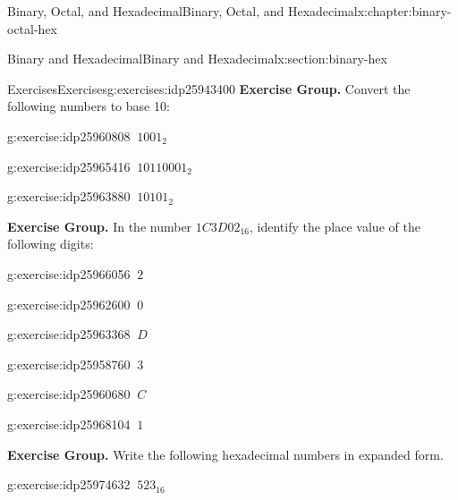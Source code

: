 \documentclass[twoside,10pt,]{book}
\numberwithin{equation}{section}
\begin{document}
\begin{chapterptx}{Binary, Octal, and Hexadecimal}{}{Binary, Octal, and Hexadecimal}{}{}{x:chapter:binary-octal-hex}
\begin{sectionptx}{Binary and Hexadecimal}{}{Binary and Hexadecimal}{}{}{x:section:binary-hex}
\begin{exercises-subsection}{Exercises}{}{Exercises}{}{}{g:exercises:idp25943400}
\textbf{Exercise Group.}\space\space%
Convert the following numbers to base 10:%
\begin{exercisegroup}
\begin{divisionexerciseeg}{10}{}{}{g:exercise:idp25960808}%
\(\ 1001_2\)\end{divisionexerciseeg}%
\begin{divisionexerciseeg}{11}{}{}{g:exercise:idp25965416}%
\(\ 10110001_2\)\end{divisionexerciseeg}%
\begin{divisionexerciseeg}{12}{}{}{g:exercise:idp25963880}%
\(\ 10101_2\)\end{divisionexerciseeg}%
\end{exercisegroup}
\par\medskip\noindent
\par\medskip\noindent%
\textbf{Exercise Group.}\space\space%
In the number \(1C3D02_{16}\), identify the place value of the following digits:%
\begin{exercisegroup}
\begin{divisionexerciseeg}{13}{}{}{g:exercise:idp25966056}%
\(\ 2\)\end{divisionexerciseeg}%
\begin{divisionexerciseeg}{14}{}{}{g:exercise:idp25962600}%
\(\ 0\)\end{divisionexerciseeg}%
\begin{divisionexerciseeg}{15}{}{}{g:exercise:idp25963368}%
\(\ D\)\end{divisionexerciseeg}%
\begin{divisionexerciseeg}{16}{}{}{g:exercise:idp25958760}%
\(\ 3\)\end{divisionexerciseeg}%
\begin{divisionexerciseeg}{17}{}{}{g:exercise:idp25960680}%
\(\ C\)\end{divisionexerciseeg}%
\begin{divisionexerciseeg}{18}{}{}{g:exercise:idp25968104}%
\(\ 1\)\end{divisionexerciseeg}%
\end{exercisegroup}
\par\medskip\noindent
\par\medskip\noindent%
\textbf{Exercise Group.}\space\space%
Write the following hexadecimal numbers in expanded form.%
\begin{exercisegroup}
\begin{divisionexerciseeg}{19}{}{}{g:exercise:idp25974632}%
\(\ 523_{16}\)\end{divisionexerciseeg}%

\end{exercisegroup}
\end{exercises-subsection}
\end{sectionptx}
\end{chapterptx}
\end{document}
